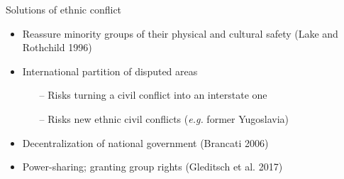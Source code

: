 \documentclass[xcolor=table]{beamer}
\begin{document}
\begin{frame}{Solutions of ethnic conflict}
\begin{itemize}
\item Reassure minority groups of their physical and cultural safety (Lake and Rothchild 1996) \pause
\item International partition of disputed areas \pause
	\begin{itemize}
	\item[--] Risks turning a civil conflict into an interstate one \pause
	\item[--] Risks new ethnic civil conflicts (\textit{e.g.} former Yugoslavia)
	\end{itemize} \pause
\item Decentralization of national government (Brancati 2006) \pause
\item Power-sharing; granting group rights (Gleditsch et al. 2017)
\end{itemize}
\end{frame}







\end{document}
